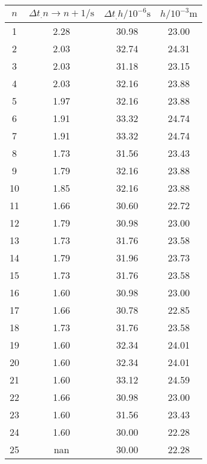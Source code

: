 \label{tab:tabHerz}
	\begin{tabular}{S[table-format=1.0]S[table-format=1.2]S[table-format=2.2]S[table-format=2.2]}
		\toprule
		{$n$} & {$\Delta t_.{n\rightarrow n+1}/\si{\second}$} &{$\Delta t_.{h}/10^{-6}\si{\second}$} & {$h/10^{-3}\si{\metre}$} \\
		 & 2.28 & 30.98 & 23.00 \\
		2 & 2.03 & 32.74 & 24.31 \\
		3 & 2.03 & 31.18 & 23.15 \\
		4 & 2.03 & 32.16 & 23.88 \\
		5 & 1.97 & 32.16 & 23.88 \\
		6 & 1.91 & 33.32 & 24.74 \\
		7 & 1.91 & 33.32 & 24.74 \\
		8 & 1.73 & 31.56 & 23.43 \\
		9 & 1.79 & 32.16 & 23.88 \\
		10 & 1.85 & 32.16 & 23.88 \\
		11 & 1.66 & 30.60 & 22.72 \\
		12 & 1.79 & 30.98 & 23.00 \\
		13 & 1.73 & 31.76 & 23.58 \\
		14 & 1.79 & 31.96 & 23.73 \\
		15 & 1.73 & 31.76 & 23.58 \\
		16 & 1.60 & 30.98 & 23.00 \\
		17 & 1.66 & 30.78 & 22.85 \\
		18 & 1.73 & 31.76 & 23.58 \\
		19 & 1.60 & 32.34 & 24.01 \\
		20 & 1.60 & 32.34 & 24.01 \\
		21 & 1.60 & 33.12 & 24.59 \\
		22 & 1.66 & 30.98 & 23.00 \\
		23 & 1.60 & 31.56 & 23.43 \\
		24 & 1.60 & 30.00 & 22.28 \\
		25 & nan & 30.00 & 22.28 \\
		\bottomrule
	\end{tabular}
